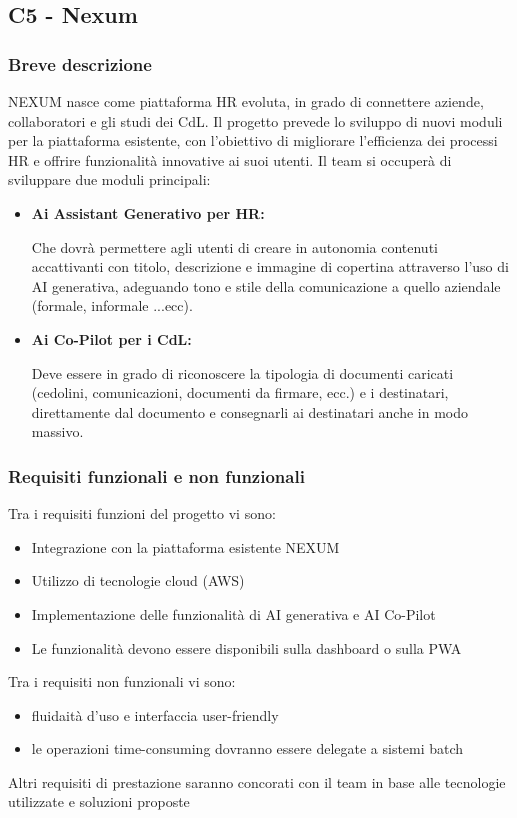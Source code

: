 \documentclass[a4paper,11pt]{article}
\begin{document}
\newpage
\subsection{C5 - Nexum}
\subsubsection{Breve descrizione}
\parbox[t]{\linewidth}{%
NEXUM nasce come piattaforma HR evoluta, in grado di connettere aziende, collaboratori e gli studi dei CdL. Il progetto prevede lo sviluppo di nuovi moduli per la piattaforma esistente, con l'obiettivo di migliorare l'efficienza dei processi HR e offrire funzionalità innovative ai suoi utenti.
Il team si occuperà di sviluppare due moduli principali:
}

\begin{itemize}
\item \textbf{Ai Assistant Generativo per HR:} \\
\begin{minipage}[t]{\dimexpr\linewidth-2em}
Che dovrà permettere agli utenti di creare in autonomia contenuti accattivanti con titolo, descrizione e immagine di copertina attraverso l'uso di AI generativa, adeguando tono e stile della comunicazione a quello aziendale (formale, informale ...ecc).
\end{minipage}

\item \textbf{Ai Co-Pilot per i CdL:} \\
\begin{minipage}[t]{\dimexpr\linewidth-2em}
Deve essere in grado di riconoscere la tipologia di documenti caricati (cedolini, comunicazioni, documenti da firmare, ecc.) e i destinatari, direttamente dal documento e consegnarli ai destinatari anche in modo massivo.
\end{minipage}
\end{itemize}

\subsubsection{Requisiti funzionali e non funzionali}
Tra i requisiti funzioni del progetto vi sono:
\begin{itemize}[noitemsep, topsep=0pt]
  \item Integrazione con la piattaforma esistente NEXUM
  \item Utilizzo di tecnologie cloud (AWS)
  \item Implementazione delle funzionalità di AI generativa e AI Co-Pilot
  \item Le funzionalità devono essere disponibili sulla dashboard o sulla PWA
\end{itemize}
Tra i requisiti non funzionali vi sono:
\begin{itemize}[noitemsep, topsep=0pt]
  \item fluidaità d'uso e interfaccia user-friendly
  \item le operazioni time-consuming dovranno essere delegate a sistemi batch
\end{itemize}
Altri requisiti di prestazione saranno concorati con il team in base alle tecnologie utilizzate e soluzioni proposte
\end{document}
